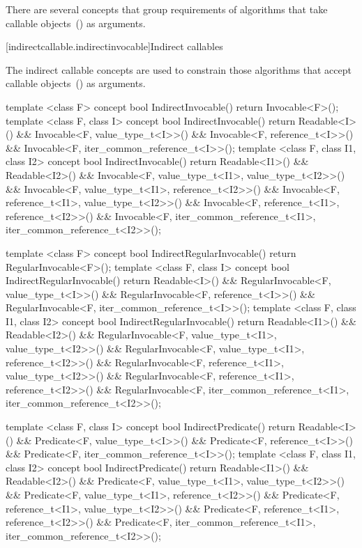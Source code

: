 \pnum
There are several concepts that group requirements of algorithms that take callable
objects~() as arguments.

[indirectcallable.indirectinvocable]{Indirect callables}

\pnum
The indirect callable concepts are used to constrain those algorithms that accept
callable objects~() as arguments.

%
%
%
%
%
%
\begin{codeblock}
  template <class F>
  concept bool IndirectInvocable() {
    return Invocable<F>();
  }
  template <class F, class I>
  concept bool IndirectInvocable() {
    return Readable<I>() &&
      Invocable<F, value_type_t<I>>() &&
      Invocable<F, reference_t<I>>() &&
      Invocable<F, iter_common_reference_t<I>>();
  }
  template <class F, class I1, class I2>
  concept bool IndirectInvocable() {
    return Readable<I1>() && Readable<I2>() &&
      Invocable<F, value_type_t<I1>, value_type_t<I2>>() &&
      Invocable<F, value_type_t<I1>, reference_t<I2>>() &&
      Invocable<F, reference_t<I1>, value_type_t<I2>>() &&
      Invocable<F, reference_t<I1>, reference_t<I2>>() &&
      Invocable<F, iter_common_reference_t<I1>, iter_common_reference_t<I2>>();
  }

  template <class F>
  concept bool IndirectRegularInvocable() {
    return RegularInvocable<F>();
  }
  template <class F, class I>
  concept bool IndirectRegularInvocable() {
    return Readable<I>() &&
      RegularInvocable<F, value_type_t<I>>() &&
      RegularInvocable<F, reference_t<I>>() &&
      RegularInvocable<F, iter_common_reference_t<I>>();
  }
  template <class F, class I1, class I2>
  concept bool IndirectRegularInvocable() {
    return Readable<I1>() && Readable<I2>() &&
      RegularInvocable<F, value_type_t<I1>, value_type_t<I2>>() &&
      RegularInvocable<F, value_type_t<I1>, reference_t<I2>>() &&
      RegularInvocable<F, reference_t<I1>, value_type_t<I2>>() &&
      RegularInvocable<F, reference_t<I1>, reference_t<I2>>() &&
      RegularInvocable<F, iter_common_reference_t<I1>, iter_common_reference_t<I2>>();
  }

  template <class F, class I>
  concept bool IndirectPredicate() {
    return Readable<I>() &&
      Predicate<F, value_type_t<I>>() &&
      Predicate<F, reference_t<I>>() &&
      Predicate<F, iter_common_reference_t<I>>();
  }
  template <class F, class I1, class I2>
  concept bool IndirectPredicate() {
    return Readable<I1>() && Readable<I2>() &&
      Predicate<F, value_type_t<I1>, value_type_t<I2>>() &&
      Predicate<F, value_type_t<I1>, reference_t<I2>>() &&
      Predicate<F, reference_t<I1>, value_type_t<I2>>() &&
      Predicate<F, reference_t<I1>, reference_t<I2>>() &&
      Predicate<F, iter_common_reference_t<I1>, iter_common_reference_t<I2>>();
  }


\end{codeblock}
